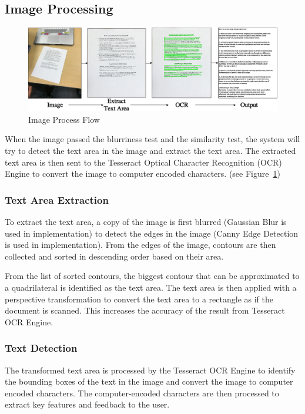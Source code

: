 \subsection{Image Processing}
\begin{figure}
	\centering
    \includegraphics[scale = 0.4]{ImageProcess.png}
    
    \caption{Image Process Flow}
	\label{imageProcessFlow}
\end{figure}
When the image passed the blurriness test and the similarity test, the system will try to detect the text area in the image and extract the text area. The extracted text area is then sent to the Tesseract Optical Character Recognition (OCR) Engine to convert the image to computer encoded characters. (see Figure~\ref{imageProcessFlow})

\pagebreak

\subsubsection{Text Area Extraction}
To extract the text area, a copy of the image is first blurred (Gaussian Blur is used in implementation) to detect the edges in the image (Canny Edge Detection is used in implementation). From the edges of the image, contours are then collected and sorted in descending order based on their area.


From the list of sorted contours, the biggest contour that can be approximated to a quadrilateral is identified as the text area. The text area is then applied with a perspective transformation to convert the text area to a rectangle	 as if the document is scanned. This increases the accuracy of the result from Tesseract OCR Engine. 

\subsubsection{Text Detection}
The transformed text area is processed by the Tesseract OCR Engine to identify the bounding boxes of the text in the image and convert the image to computer encoded characters. The computer-encoded characters are then processed to extract key features and feedback to the user.


